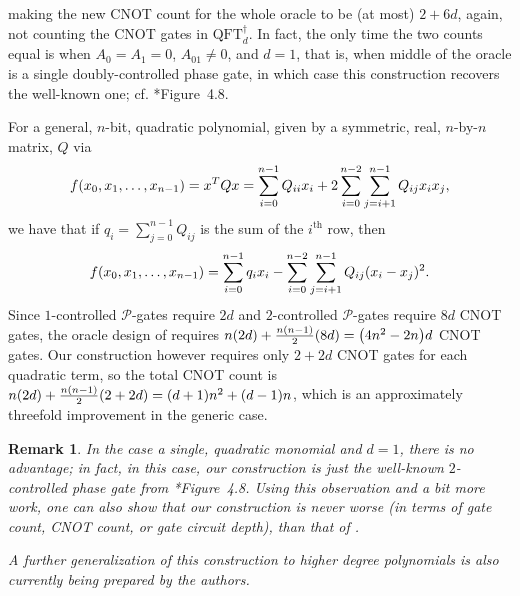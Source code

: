 \documentclass[reqno,10pt]{amsart}
\numberwithin{equation}{section}                %
\let\originalleft\left
\let\originalright\right
\renewcommand{\left}{\mathopen{}\mathclose\bgroup\originalleft}
\renewcommand{\right}{\aftergroup\egroup\originalright}
\def\({\mathopen{}\left(}
\def\){\right)\mathclose{}}
\newtheorem{remark}[theorem]{Remark}
\def\cP{\mathcal{P}}
\def\QFT{\mathrm{QFT}}
\begin{document}
making the new CNOT count for the whole oracle to be (at most) $2 + 6d$, again, not counting the CNOT gates in $\QFT_d^\dagger$. In fact, the only time the two counts equal is when $A_0 = A_1 = 0$, $A_{01} \neq 0$, and $d = 1$, that is, when middle of the oracle is a single doubly-controlled phase gate, in which case this construction recovers the well-known one; cf. \cite{nielsen_quantum_2010}*{Figure~4.8}.

\smallskip

For a general, $n$-bit, quadratic polynomial, given by a symmetric, real, $n$-by-$n$ matrix, $Q$ via
\begin{equation}
   f \( x_0, x_1, \ldots, x_{n - 1} \) = x^T Q x = \sum\limits_{i = 0}^{n - 1} Q_{ii} x_i + 2 \sum\limits_{i = 0}^{n - 2} \sum\limits_{j = i + 1}^{n - 1} Q_{ij} x_i x_j,
\end{equation}
we have that if $q_i = \sum\limits_{j = 0}^{n - 1} Q_{ij}$ is the sum of the $i^{\mathrm{th}}$ row, then
\begin{align}
   f \( x_0, x_1, \ldots, x_{n - 1} \) = \sum\limits_{i = 0}^{n - 1} q_i x_i - \sum\limits_{i = 0}^{n - 2} \sum\limits_{j = i + 1}^{n - 1} Q_{ij} \( x_i - x_j \)^2.
\end{align}
Since $1$-controlled $\cP$-gates require $2d$ and $2$-controlled $\cP$-gates require $8d$ CNOT gates, the oracle design of \cite{gilliam_grover_2021} requires $n \( 2 d \) + \tfrac{n \( n - 1 \)}{2} \( 8 d \) = \( 4 n^2 - 2 n \) d$ CNOT gates. Our construction however requires only $2 + 2d$ CNOT gates for each quadratic term, so the total CNOT count is $n \( 2 d \) + \tfrac{n \( n - 1 \)}{2} \( 2 + 2 d \) = \( d + 1 \) n^2 + \( d - 1\) n$, which is an approximately threefold improvement in the generic case.

\begin{remark}
   In the case a single, quadratic monomial and $d = 1$, there is no advantage; in fact, in this case, our construction is just the well-known $2$-controlled phase gate from \cite{nielsen_quantum_2010}*{Figure~4.8}. Using this observation and a bit more work, one can also show that our construction is never worse (in terms of gate count, CNOT count, or gate circuit depth), than that of \cite{gilliam_grover_2021}.

   A further generalization of this construction to higher degree polynomials is also currently being prepared by the authors.
\end{remark}

\bigskip
\end{document}

